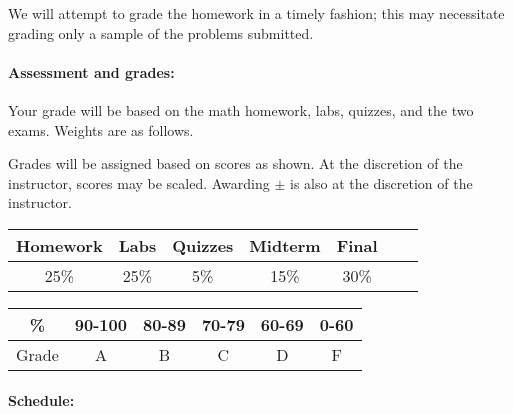 \documentclass{article}
\begin{document}
We will attempt to grade the homework in a timely fashion; this may
necessitate grading only a sample of the problems submitted.

\paragraph{Assessment and grades:}

Your grade will be based on the math homework, labs, quizzes, and the
two exams. Weights are as follows.

Grades will be assigned based on scores as shown.  At the discretion
of the instructor, scores may be scaled.  Awarding $\pm$ is also at
the discretion of the instructor.

\begin{tabular}{|c|c|c|c|c|c|c|}\hline
Homework & Labs & Quizzes & Midterm & Final\\\hline
25\% & 25\% & 5\% & 15\% & 30\% \\\hline
\end{tabular}\hfill
\begin{tabular}{|c|c|c|c|c|c|}\hline
\% & 90-100 & 80-89 & 70-79 & 60-69 & 0-60\\\hline
Grade & A & B & C & D & F\\\hline
\end{tabular}


  
\paragraph{Schedule:}
\end{document}

